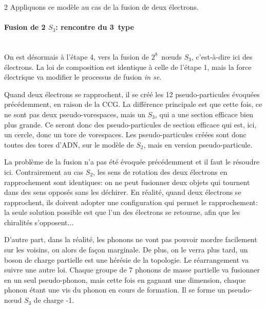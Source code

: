 \begin{multicols}{2}
Appliquons ce modèle au cas de la fusion de deux électrons.

\paragraph{Fusion de 2 $S_3$: rencontre du 3\ieme\ type}~\\

On est désormais à l'étape 4, vers la fusion de $2^8$~nœuds $S_3$,
c'est-à-dire ici des électrons. La loi de composition est identique à
celle de l'étape 1, mais la force électrique va modifier le processus
de fusion \textit{in se}.

Quand deux électrons se rapprochent, il se créé les 12
pseudo-particules évoquées précédemment, en raison de la CCG. La
différence principale est que cette fois, ce ne sont pas deux
pseudo-vorespaces, mais un $S_3$, qui a une section efficace bien plus
grande. Ce seront donc des pseudo-particules de section efficace qui
est, ici, un cercle, donc un tore de vorespaces. Les pseudo-particules
créées sont donc toutes des tores d'ADN, sur le modèle de $S_2$, mais en
version pseudo-particule.

La problème de la fusion n'a pas été évoquée précédemment et il faut
le résoudre ici. Contrairement au cas $S_2$, les sens de rotation des
deux électrons en rapprochement sont identiques: on ne peut fusionner
deux objets qui tournent dans des sens opposés sans les déchirer. En
réalité, quand deux électrons se rapprochent, ils doivent adopter une
configuration qui permet le rapprochement: la seule solution possible
est que l'un des électrons se retourne, afin que les chiralités
s'opposent$\ldots$

D'autre part, dans la réalité, les phonons ne vont pas pouvoir mordre
facilement sur les voisins, ou alors de façon marginale. De plus, on
le verra plus tard, un boson de charge partielle est une hérésie de la
topologie. Le réarrangement va suivre une autre loi. Chaque groupe de
7 phonons de masse partielle va fusionner en un seul pseudo-phonon,
mais cette fois en gagnant une dimension, chaque phonon étant une vis
du phonon en cours de formation. Il se forme un pseudo-nœud $S_3$ de
charge -1.


\end{multicols}
